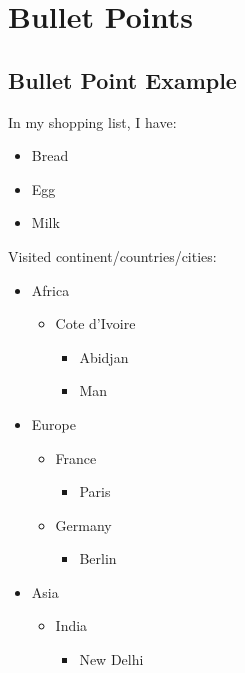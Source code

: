 \documentclass[10pt]{report}
\begin{document}
\chapter{Bullet Points}\label{ch:Bullet Points}

\section{Bullet Point Example}


In my shopping list, I have:

\begin{itemize}
\item Bread
\item Egg

\item Milk

\end{itemize}


Visited continent/countries/cities:

\begin{itemize}
\item Africa
\begin{itemize}
\item Cote d'Ivoire

\begin{itemize}
\item Abidjan

\item Man

\end{itemize}
\end{itemize}
\item Europe

\begin{itemize}
\item France

\begin{itemize}
\item Paris

\end{itemize}
\item Germany

\begin{itemize}
\item Berlin

\end{itemize}
\end{itemize}
\item Asia

\begin{itemize}
\item India

\begin{itemize}
\item New Delhi

\end{itemize}
\end{itemize}
\end{itemize}
\end{document}
